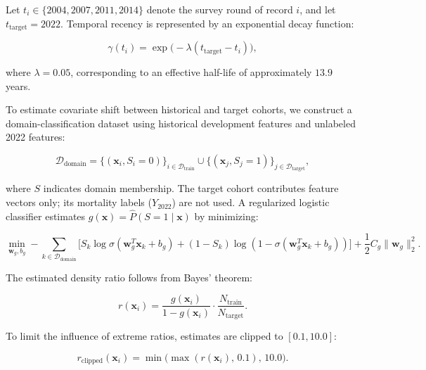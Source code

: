 \documentclass[a4paper,fleqn]{cas-sc}
\begin{document}
Let $t_i \in \{2004, 2007, 2011, 2014\}$ denote the survey round of record $i$, and let $t_{\text{target}}=2022$. Temporal recency is represented by an exponential decay function:

\begin{equation}
  \gamma(t_i) = \exp\Big( -\lambda (t_{\text{target}} - t_i) \Big),
  \label{eq:recency_decay}
\end{equation}

where $\lambda=0.05$, corresponding to an effective half-life of approximately $13.9$ years.

To estimate covariate shift between historical and target cohorts, we construct a domain-classification dataset using historical development features and unlabeled 2022 features:

\begin{equation}
  \mathcal{D}_{\text{domain}} = \Big\{ (\mathbf{x}_i, S_i = 0) \Big\}_{i \in \mathcal{D}_{\text{train}}} \cup \Big\{ (\mathbf{x}_j, S_j = 1) \Big\}_{j \in \mathcal{D}_{\text{target}}},
  \label{eq:domain_data}
\end{equation}

where $S$ indicates domain membership. The target cohort contributes feature vectors only; its mortality labels ($Y_{2022}$) are not used. A regularized logistic classifier estimates $g(\mathbf{x})=\hat{P}(S=1\mid\mathbf{x})$ by minimizing:

\begin{equation}
  \min_{\mathbf{w}_g, b_g} - \sum_{k \in \mathcal{D}_{\text{domain}}} \Big[ S_k \log \sigma(\mathbf{w}_g^T \mathbf{x}_k + b_g) + (1 - S_k) \log(1 - \sigma(\mathbf{w}_g^T \mathbf{x}_k + b_g)) \Big] + \frac{1}{2} C_g \|\mathbf{w}_g\|_2^2.
  \label{eq:domain_mle}
\end{equation}

The estimated density ratio follows from Bayes' theorem:

\begin{equation}
  r(\mathbf{x}_i) = \frac{g(\mathbf{x}_i)}{1 - g(\mathbf{x}_i)} \cdot \frac{N_{\text{train}}}{N_{\text{target}}}.
  \label{eq:raw_density}
\end{equation}

To limit the influence of extreme ratios, estimates are clipped to $[0.1,10.0]$:

\begin{equation}
  r_{\text{clipped}}(\mathbf{x}_i) = \min\Big( \max(r(\mathbf{x}_i), \, 0.1), \, 10.0 \Big).
  \label{eq:density_clip}
\end{equation}
\end{document}
